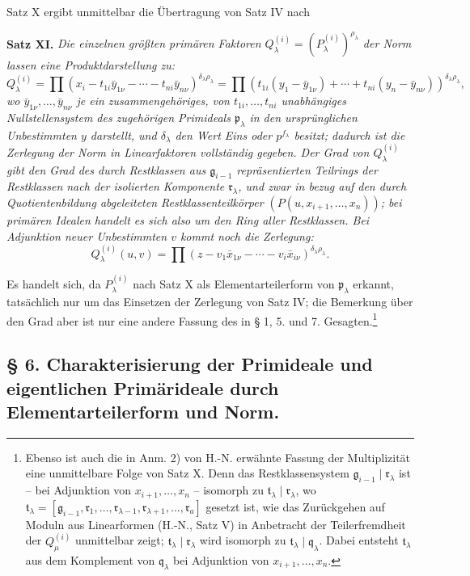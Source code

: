 \documentclass[11pt]{article}
\providecommand{\frakp}{\mathfrak p}
\providecommand{\frakq}{\mathfrak q}
\providecommand{\frakr}{\mathfrak r}
\providecommand{\frakg}{\mathfrak g}
\providecommand{\frakt}{\mathfrak t}
\begin{document}
Satz X ergibt unmittelbar die Übertragung von Satz IV nach

\textbf{Satz XI.} \emph{Die einzelnen größten primären Faktoren $Q_\lambda^{(i)}=(P_\lambda^{(i)})^{\rho_\lambda}$ der Norm lassen eine Produktdarstellung zu:}
\[
 Q_\lambda^{(i)}=\prod (x_i-t_{1i}\bar y_{1\nu}-\cdots-t_{ni}\bar y_{n\nu})^{\delta_\lambda\rho_\lambda}
 =\prod (t_{1i}(y_1-\bar y_{1\nu})+\cdots+t_{ni}(y_n-\bar y_{n\nu}))^{\delta_\lambda\rho_\lambda},
\]
\emph{wo $\bar y_{1\nu},\ldots,\bar y_{n\nu}$ je ein zusammengehöriges, von $t_{1i},\ldots,t_{ni}$ unabhängiges Nullstellensystem des zugehörigen Primideals $\frakp_\lambda$ in den ursprünglichen Unbestimmten $y$ darstellt, und $\delta_\lambda$ den Wert Eins oder $p^{f_\lambda}$ besitzt; dadurch ist die Zerlegung der Norm in Linearfaktoren vollständig gegeben. Der Grad von $Q_\lambda^{(i)}$ gibt den Grad des durch Restklassen aus $\frakg_{i-1}$ repräsentierten Teilrings der Restklassen nach der isolierten Komponente $\frakr_\lambda$, und zwar in bezug auf den durch Quotientenbildung abgeleiteten Restklassenteilkörper $(P(u,x_{i+1},\ldots,x_n))$; bei primären Idealen handelt es sich also um den Ring aller Restklassen. Bei Adjunktion neuer Unbestimmten $v$ kommt noch die Zerlegung:}
\[
 Q_\lambda^{(i)}(u,v)=\prod (z-v_1\bar x_{1\nu}-\cdots-v_i\bar x_{i\nu})^{\delta_\lambda\rho_\lambda}.
\]

Es handelt sich, da $P_\lambda^{(i)}$ nach Satz X als Elementarteilerform von $\frakp_\lambda$ erkannt, tatsächlich nur um das Einsetzen der Zerlegung von Satz IV; die Bemerkung über den Grad aber ist nur eine andere Fassung des in § 1, 5. und 7. Gesagten.\footnote{Ebenso ist auch die in Anm. 2) von H.-N. erwähnte Fassung der Multiplizität eine unmittelbare Folge von Satz X. Denn das Restklassensystem $\frakg_{i-1}\mid\frakr_\lambda$ ist -- bei Adjunktion von $x_{i+1},\ldots,x_n$ -- isomorph zu $\frakt_\lambda\mid\frakr_\lambda$, wo $\frakt_\lambda=[\frakg_{i-1},\frakr_1,\ldots,\frakr_{\lambda-1},\frakr_{\lambda+1},\ldots,\frakr_a]$ gesetzt ist, wie das Zurückgehen auf Moduln aus Linearformen (H.-N., Satz V) in Anbetracht der Teilerfremdheit der $Q_\mu^{(i)}$ unmittelbar zeigt; $\frakt_\lambda\mid\frakr_\lambda$ wird isomorph zu $\frakt_\lambda\mid\frakq_\lambda$. Dabei entsteht $\frakt_\lambda$ aus dem Komplement von $\frakq_\lambda$ bei Adjunktion von $x_{i+1},\ldots,x_n$.}

\subsection*{§ 6. Charakterisierung der Primideale und eigentlichen Primärideale durch Elementarteilerform und Norm.}
\end{document}
